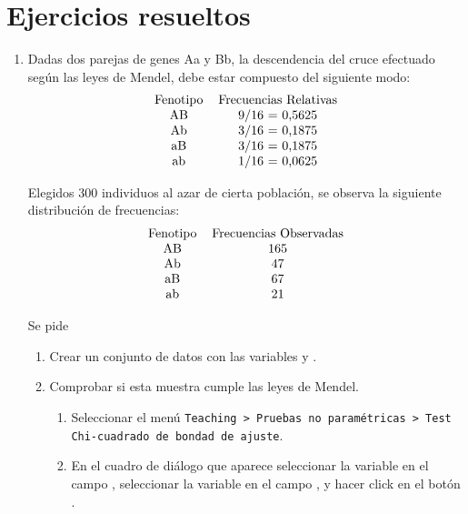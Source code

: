 \clearpage
\newpage

\section{Ejercicios resueltos}
\begin{enumerate}[leftmargin=*]

\item Dadas dos parejas de genes Aa y Bb, la descendencia del cruce efectuado según las leyes de Mendel, debe estar
compuesto del siguiente modo:
\[
\begin{tabular}{ll}
\multicolumn{1}{c}{Fenotipo} & \multicolumn{1}{c}{Frecuencias Relativas} \\
\multicolumn{1}{c}{AB} & \multicolumn{1}{c}{9/16 = 0,5625} \\
\multicolumn{1}{c}{Ab} & \multicolumn{1}{c}{3/16 = 0,1875} \\
\multicolumn{1}{c}{aB} & \multicolumn{1}{c}{3/16 = 0,1875} \\
\multicolumn{1}{c}{ab} & \multicolumn{1}{c}{1/16 = 0,0625} \\
\end{tabular}
\]

Elegidos 300 individuos al azar de cierta población, se observa la siguiente distribución de frecuencias:
\[
\begin{tabular}{ll}
\multicolumn{1}{c}{Fenotipo} & \multicolumn{1}{c}{Frecuencias Observadas} \\
\multicolumn{1}{c}{AB} & \multicolumn{1}{c}{165} \\
\multicolumn{1}{c}{Ab} & \multicolumn{1}{c}{47} \\
\multicolumn{1}{c}{aB} & \multicolumn{1}{c}{67} \\
\multicolumn{1}{c}{ab} & \multicolumn{1}{c}{21} \\
\end{tabular}
\]

Se pide

\begin{enumerate}
\item Crear un conjunto de datos con las variables  y .

\item Comprobar si esta muestra cumple las leyes de Mendel.
\begin{indicacion}
\begin{enumerate}
\item Seleccionar el menú \texttt{Teaching > Pruebas no paramétricas > Test Chi-cuadrado de bondad de ajuste}.
\item En el cuadro de diálogo que aparece seleccionar la variable  en el campo
, seleccionar la variable  en el campo , y hacer click en el botón .
\end{enumerate}
\end{indicacion}


\end{enumerate}
\end{enumerate}
